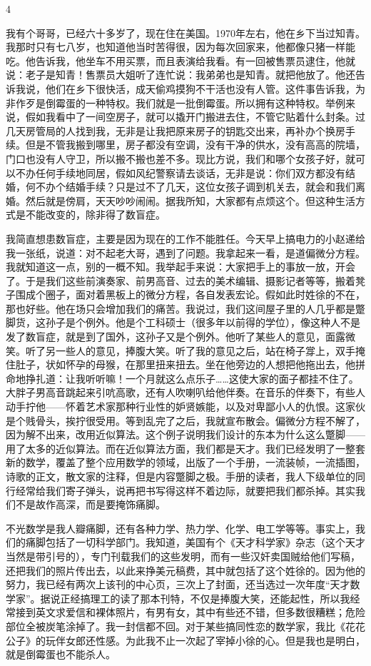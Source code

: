 4 

我有个哥哥，已经六十多岁了，现在住在美国。1970年左右，他在乡下当过知青。我那时只有七八岁，也知道他当时苦得很，因为每次回家来，他都像只猪一样能吃。他告诉我，他坐车不用买票，而且表演给我看。有一回被售票员逮住，他就说：老子是知青！售票员大姐听了连忙说：我弟弟也是知青。就把他放了。他还告诉我说，他们在乡下很快活，成天偷鸡摸狗不干活也没有人管。这件事告诉我，为非作歹是倒霉蛋的一种特权。我们就是一批倒霉蛋。所以拥有这种特权。举例来说，假如我看中了一间空房子，就可以撬开门搬进去住，不管它贴着什么封条。过几天房管局的人找到我，无非是让我把原来房子的钥匙交出来，再补办个换房手续。但是不管我搬到哪里，房子都没有空调，没有干净的供水，没有高高的院墙，门口也没有人守卫，所以搬不搬也差不多。现比方说，我们和哪个女孩子好，就可以不办任何手续地同居，假如风纪警察请去谈话，无非是说：你们双方都没有结婚，何不办个结婚手续？只是过不了几天，这位女孩子调到机关去，就会和我们离婚。然后就是傍肩，天天吵吵闹闹。据我所知，大家都有点烦这个。但这种生活方式是不能改变的，除非得了数盲症。 



我简直想患数盲症，主要是因为现在的工作不能胜任。今天早上搞电力的小赵递给我一张纸，说道：对不起老大哥，遇到了问题。我拿起来一看，是道偏微分方程。我就知道这一点，别的一概不知。我举起手来说：大家把手上的事放一放，开会了。于是我们这些前演奏家、前男高音、过去的美术编辑、摄影记者等等，搬着凳子围成个圈子，面对着黑板上的微分方程，各自发表宏论。假如此时姓徐的不在，那也好些。他在场只会增加我们的痛苦。我说过，我们这间屋子里的人几乎都是蹩脚货，这孙子是个例外。他是个工科硕士（很多年以前得的学位），像这种人不是发了数盲症，就是到了国外，这孙子又是个例外。他听了某些人的意见，面露微笑。听了另一些人的意见，捧腹大笑。听了我的意见之后，站在椅子牚上，双手掩住肚子，状如怀孕的母猴，在那里扭来扭去。坐在他旁边的人想把他拖出去，他拼命地挣扎道：让我听听嘛！一个月就这么点乐子……这使大家的面子都挂不住了。大胖子男高音跳起来引吭高歌，还有人吹喇叭给他伴奏。在音乐的伴奏下，有些人动手拧他——怀着艺术家那种行业性的妒贤嫉能，以及对卑鄙小人的仇恨。这家伙是个贱骨头，挨拧很受用。等到乱完了之后，我就宣布散会。偏微分方程不解了，因为解不出来，改用近似算法。这个例子说明我们设计的东本为什么这么蹩脚——用了太多的近似算法。而在近似算法方面，我们都是天才。我们已经发明了一整套新的数学，覆盖了整个应用数学的领域，出版了一个手册，一流装帧，一流插图，诗歌的正文，散文家的注释，但是内容蹩脚之极。手册的读者，我人下级单位的同行经常给我们寄子弹头，说再把书写得这样不着边际，就要把我们都杀掉。其实我们不是故作高深，而是要掩饰痛脚。 

不光数学是我人瓣痛脚，还有各种力学、热力学、化学、电工学等等。事实上，我们的痛脚包括了一切科学部门。我知道，美国有个《天才科学家》杂志（这个天才当然是带引号的），专门刊载我们的这些发明，而有一些汉奸卖国贼给他们写稿，还把我们的照片传出去，以此来挣美元稿费，其中就包括了这个姓徐的。因为他的努力，我已经有两次上该刊的中心页，三次上了封面，还当选过一次年度“天才数学家”。据说正经搞理工的读了那本刊特，不仅是捧腹大笑，还能起性，所以我经常接到英文求爱信和裸体照片，有男有女，其中有些还不错，但多数很糟糕；危险部位全被炭笔涂掉了。我一封信都不回。对于某些搞同性恋的数学家，我比《花花公子》的玩伴女郎还性感。为此我不止一次起了宰掉小徐的心。但是我也是明白，就是倒霉蛋也不能杀人。 

